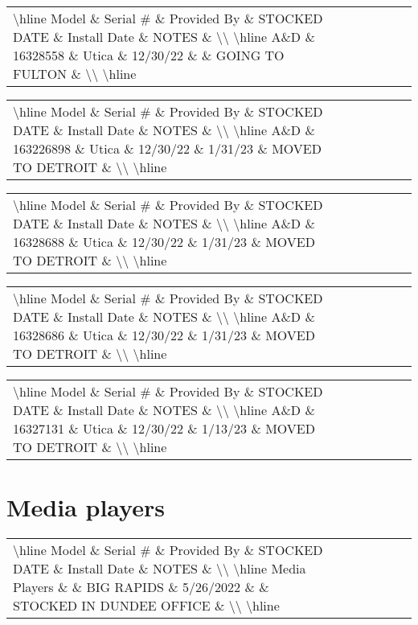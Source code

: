\documentclass{article}%
\begin{document}
\begin{tabularx}{\textwidth}{|X|X|X|X|X|X|X|}%
\textbackslash{}hline%
Model \& Serial \# \& Provided By \& STOCKED DATE \& Install Date \& NOTES \&  \textbackslash{}\textbackslash{}%
\textbackslash{}hline%
A\&D \& 16328558 \& Utica \& 12/30/22 \&  \& GOING TO FULTON \&  \textbackslash{}\textbackslash{}%
\textbackslash{}hline%
\end{tabularx}%
\begin{tabularx}{\textwidth}{|X|X|X|X|X|X|X|}%
\textbackslash{}hline%
Model \& Serial \# \& Provided By \& STOCKED DATE \& Install Date \& NOTES \&  \textbackslash{}\textbackslash{}%
\textbackslash{}hline%
A\&D \& 163226898 \& Utica \& 12/30/22 \& 1/31/23 \& MOVED TO DETROIT \&  \textbackslash{}\textbackslash{}%
\textbackslash{}hline%
\end{tabularx}%
\begin{tabularx}{\textwidth}{|X|X|X|X|X|X|X|}%
\textbackslash{}hline%
Model \& Serial \# \& Provided By \& STOCKED DATE \& Install Date \& NOTES \&  \textbackslash{}\textbackslash{}%
\textbackslash{}hline%
A\&D \& 16328688 \& Utica \& 12/30/22 \& 1/31/23 \& MOVED TO DETROIT \&  \textbackslash{}\textbackslash{}%
\textbackslash{}hline%
\end{tabularx}%
\begin{tabularx}{\textwidth}{|X|X|X|X|X|X|X|}%
\textbackslash{}hline%
Model \& Serial \# \& Provided By \& STOCKED DATE \& Install Date \& NOTES \&  \textbackslash{}\textbackslash{}%
\textbackslash{}hline%
A\&D \& 16328686 \& Utica \& 12/30/22 \& 1/31/23 \& MOVED TO DETROIT \&  \textbackslash{}\textbackslash{}%
\textbackslash{}hline%
\end{tabularx}%
\begin{tabularx}{\textwidth}{|X|X|X|X|X|X|X|}%
\textbackslash{}hline%
Model \& Serial \# \& Provided By \& STOCKED DATE \& Install Date \& NOTES \&  \textbackslash{}\textbackslash{}%
\textbackslash{}hline%
A\&D \& 16327131 \& Utica \& 12/30/22 \& 1/13/23 \& MOVED TO DETROIT \&  \textbackslash{}\textbackslash{}%
\textbackslash{}hline%
\end{tabularx}

%
\section{Media players }%
\label{sec:Mediaplayers}%
\begin{tabularx}{\textwidth}{|X|X|X|X|X|X|X|}%
\textbackslash{}hline%
Model \& Serial \# \& Provided By \& STOCKED DATE \& Install Date \& NOTES \&  \textbackslash{}\textbackslash{}%
\textbackslash{}hline%
Media Players \&  \& BIG RAPIDS \& 5/26/2022 \&  \& STOCKED IN DUNDEE OFFICE \&  \textbackslash{}\textbackslash{}%
\textbackslash{}hline%
\end{tabularx}
\end{document}
